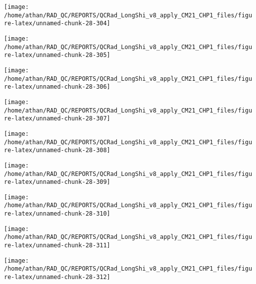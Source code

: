 \documentclass[
  10pt,
  a4paper,oneside]{article}
\begin{document}
\begin{center}\texttt{[image: /home/athan/RAD\_QC/REPORTS/QCRad\_LongShi\_v8\_apply\_CM21\_CHP1\_files/figure-latex/unnamed-chunk-28-304]} \end{center}

\begin{center}\texttt{[image: /home/athan/RAD\_QC/REPORTS/QCRad\_LongShi\_v8\_apply\_CM21\_CHP1\_files/figure-latex/unnamed-chunk-28-305]} \end{center}

\begin{center}\texttt{[image: /home/athan/RAD\_QC/REPORTS/QCRad\_LongShi\_v8\_apply\_CM21\_CHP1\_files/figure-latex/unnamed-chunk-28-306]} \end{center}

\begin{center}\texttt{[image: /home/athan/RAD\_QC/REPORTS/QCRad\_LongShi\_v8\_apply\_CM21\_CHP1\_files/figure-latex/unnamed-chunk-28-307]} \end{center}

\begin{center}\texttt{[image: /home/athan/RAD\_QC/REPORTS/QCRad\_LongShi\_v8\_apply\_CM21\_CHP1\_files/figure-latex/unnamed-chunk-28-308]} \end{center}

\begin{center}\texttt{[image: /home/athan/RAD\_QC/REPORTS/QCRad\_LongShi\_v8\_apply\_CM21\_CHP1\_files/figure-latex/unnamed-chunk-28-309]} \end{center}

\begin{center}\texttt{[image: /home/athan/RAD\_QC/REPORTS/QCRad\_LongShi\_v8\_apply\_CM21\_CHP1\_files/figure-latex/unnamed-chunk-28-310]} \end{center}

\begin{center}\texttt{[image: /home/athan/RAD\_QC/REPORTS/QCRad\_LongShi\_v8\_apply\_CM21\_CHP1\_files/figure-latex/unnamed-chunk-28-311]} \end{center}

\begin{center}\texttt{[image: /home/athan/RAD\_QC/REPORTS/QCRad\_LongShi\_v8\_apply\_CM21\_CHP1\_files/figure-latex/unnamed-chunk-28-312]} \end{center}
\end{document}
